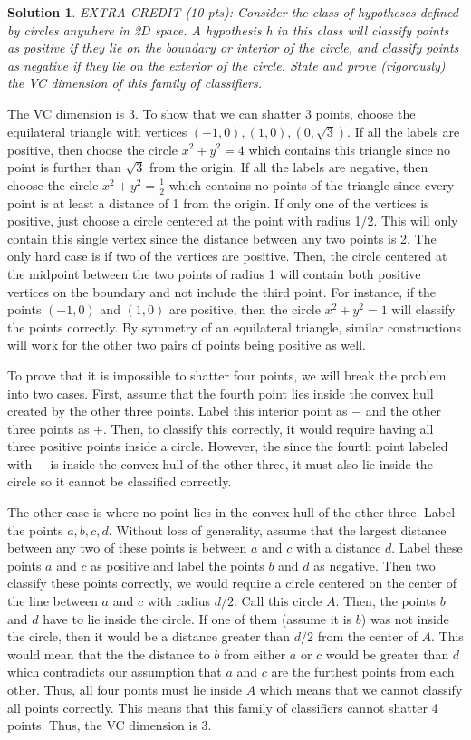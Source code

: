 \documentclass[12pt]{article}
\theoremstyle{definition}
\newtheorem*{solution*}{Solution}
\begin{document}
\begin{solution*}
			\textit{EXTRA CREDIT (10 pts): Consider the class of hypotheses defined by circles anywhere in 2D
				space. A hypothesis h in this class will classify points as positive if they lie on the boundary or
				interior of the circle, and classify points as negative if they lie on the exterior of the circle. State
				and prove (rigorously) the VC dimension of this family of classifiers.}
			
				The VC dimension is 3. To show that we can shatter 3 points, choose the equilateral triangle with vertices $(-1,0), (1,0), (0,\sqrt{3})$. If all the labels are positive, then choose the circle $x^2 + y^2  = 4$ which contains this triangle since no point is further than $\sqrt{3}$ from the origin. If all the labels are negative, then choose the circle $x^2 + y^2 = \frac{1}{2}$ which contains no points of the triangle since every point is at least a distance of 1 from the origin. If only one of the vertices is positive, just choose a circle centered at the point with radius 1/2. This will only contain this single vertex since the distance between any two points is 2. The only hard case is if two of the vertices are positive. Then, the circle centered at the midpoint between the two points of radius 1 will contain both positive vertices on the boundary and not include the third point. For instance, if the points $(-1,0)$ and $(1,0)$ are positive, then the circle $x^2+y^2 = 1$ will classify the points correctly. By symmetry of an equilateral triangle, similar constructions will work for the other two pairs of points being positive as well.  
				
				To prove that it is impossible to shatter four points, we will break the problem into two cases. First, assume that the fourth point lies inside the convex hull created by the other three points. Label this interior point as $-$ and the other three points as $+$. Then, to classify this correctly, it would require having all three positive points inside a circle. However, the since the fourth point labeled with $-$ is inside the convex hull of the other three, it must also lie inside the circle so it cannot be classified correctly.
				
				The other case is where no point lies in the convex hull of the other three. Label the points $a,b,c,d$. Without loss of generality, assume that the largest distance between any two of these points is between $a$ and $c$ with a distance $d$. Label these points $a$ and $c$ as positive and label the points $b$ and $d$ as negative. Then two classify these points correctly, we would require a circle centered on the center of the line between $a$ and $c$ with radius $d/2$. Call this circle $A$. Then, the points $b$ and $d$ have to lie inside the circle. If one of them (assume it is $b$) was not inside the circle, then it would be a distance greater than $d/2$ from the center of $A$. This would mean that the the distance to $b$ from either $a$ or $c$ would be greater than $d$ which contradicts our assumption that $a$ and $c$ are the furthest points from each other. Thus, all four points must lie inside $A$ which means that we cannot classify all points correctly. This means that this family of classifiers cannot shatter 4 points. Thus, the VC dimension is 3. 
	\end{solution*}
\end{document}
